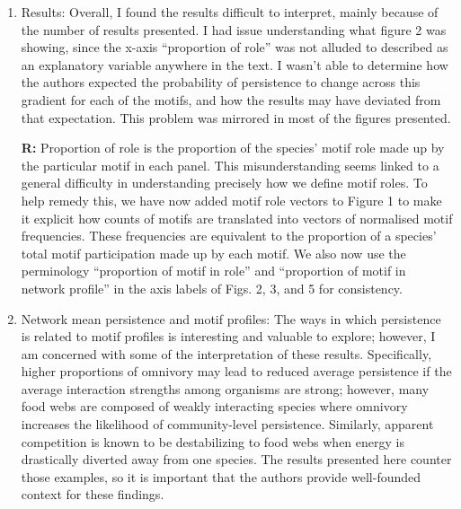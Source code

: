 \documentclass[12pt]{article}
\begin{document}
\begin{enumerate}
            \item Results: Overall, I found the results difficult to interpret, mainly because of the number of results presented. I had issue understanding what figure 2 was showing, since the x-axis ``proportion of role'' was not alluded to described as an explanatory variable anywhere in the text. I wasn't able to determine how the authors expected the probability of persistence to change across this gradient for each of the motifs, and how the results may have deviated from that expectation. This problem was mirrored in most of the figures presented.

                \textbf{R:} Proportion of role is the proportion of the species' motif role made up by the particular motif in each panel. This misunderstanding seems linked to a general difficulty in understanding precisely how we define motif roles. To help remedy this, we have now added motif role vectors to Figure 1 to make it explicit how counts of motifs are translated into vectors of normalised motif frequencies. These frequencies are equivalent to the proportion of a species' total motif participation made up by each motif. We also now use the perminology ``proportion of motif in role'' and ``proportion of motif in network profile'' in the axis labels of Figs. 2, 3, and 5 for consistency.


            \item Network mean persistence and motif profiles: The ways in which persistence is related to motif profiles is interesting and valuable to explore; however, I am concerned with some of the interpretation of these results. Specifically, higher proportions of omnivory may lead to reduced average persistence if the average interaction strengths among organisms are strong; however, many food webs are composed of weakly interacting species where omnivory increases the likelihood of community-level persistence. Similarly, apparent competition is known to be destabilizing to food webs when energy is drastically diverted away from one species. The results presented here counter those examples, so it is important that the authors provide well-founded context for these findings.


\end{enumerate}
\end{document}
